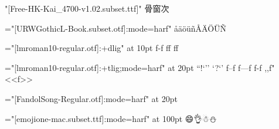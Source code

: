 \btest
\font\test"[Free-HK-Kai_4700-v1.02.subset.ttf]"\test
骨窗次
\etest

\btest
\font\test="[URWGothicL-Book.subset.otf]:mode=harf"\test
åäöüñÅÄÖÜÑ
\etest

\btest
\font\test="[lmroman10-regular.otf]:+dlig" at 10pt\test
f-f f\-f f\discretionary{-}{-}{-}f
\etest

\btest
\font\test="[lmroman10-regular.otf]:+tlig;mode=harf" at 20pt\test
``!`'' `?`' f--f f---f f-f ,,f" <<f>>
\etest

\btest
\font\test="[FandolSong-Regular.otf]:mode=harf" at 20pt\test
\the{}\font\quad\the{}\font
\etest

\btest
\font\test="[emojione-mac.subset.ttf]:mode=harf" at 100pt\test
😄👌☃⛄
\etest

\bye
